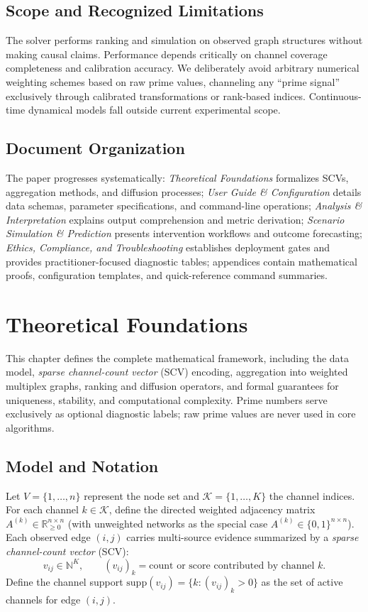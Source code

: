 \documentclass[12pt]{article}
\theoremstyle{plain}
\begin{document}
\subsection*{Scope and Recognized Limitations}
The solver performs ranking and simulation on observed graph structures without making causal claims. Performance depends critically on channel coverage completeness and calibration accuracy. We deliberately avoid arbitrary numerical weighting schemes based on raw prime values, channeling any ``prime signal'' exclusively through calibrated transformations or rank-based indices. Continuous-time dynamical models fall outside current experimental scope.

\subsection*{Document Organization}
The paper progresses systematically: \emph{Theoretical Foundations} formalizes SCVs, aggregation methods, and diffusion processes; \emph{User Guide \& Configuration} details data schemas, parameter specifications, and command-line operations; \emph{Analysis \& Interpretation} explains output comprehension and metric derivation; \emph{Scenario Simulation \& Prediction} presents intervention workflows and outcome forecasting; \emph{Ethics, Compliance, and Troubleshooting} establishes deployment gates and provides practitioner-focused diagnostic tables; appendices contain mathematical proofs, configuration templates, and quick-reference command summaries.

\section{Theoretical Foundations}
\label{sec:theory}

\noindent This chapter defines the complete mathematical framework, including the data model, \emph{sparse channel-count vector} (SCV) encoding, aggregation into weighted multiplex graphs, ranking and diffusion operators, and formal guarantees for uniqueness, stability, and computational complexity. Prime numbers serve exclusively as optional diagnostic labels; raw prime values are never used in core algorithms.

\subsection{Model and Notation}
Let $V=\{1,\dots,n\}$ represent the node set and $\mathcal{K}=\{1,\dots,K\}$ the channel indices. For each channel $k\in\mathcal{K}$, define the directed weighted adjacency matrix $A^{(k)}\in\mathbb{R}_{\ge0}^{n\times n}$ (with unweighted networks as the special case $A^{(k)}\in\{0,1\}^{n\times n}$). Each observed edge $(i,j)$ carries multi-source evidence summarized by a \emph{sparse channel-count vector} (SCV):
\[
v_{ij}\in\mathbb{N}^K,\qquad (v_{ij})_k=\text{count or score contributed by channel }k.
\]
Define the channel support $\mathrm{supp}(v_{ij})=\{k:(v_{ij})_k>0\}$ as the set of active channels for edge $(i,j)$.
\end{document}
